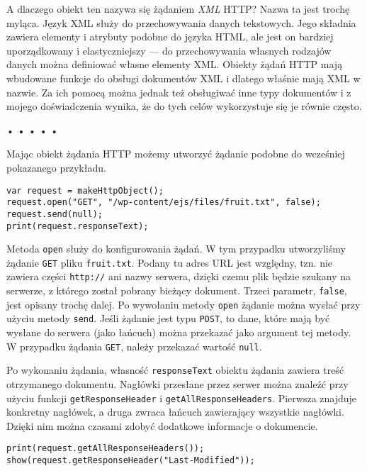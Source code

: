   
A dlaczego obiekt ten nazywa się żądaniem \emph{XML} HTTP? Nazwa ta jest trochę myląca. Język XML służy do przechowywania danych tekstowych. Jego składnia zawiera elementy i atrybuty podobne do języka HTML, ale jest on bardziej uporządkowany i elastyczniejszy — do przechowywania własnych rodzajów danych można definiować własne elementy XML. Obiekty żądań HTTP mają wbudowane funkcje do obsługi dokumentów XML i dlatego właśnie mają XML w nazwie. Za ich pomocą można jednak też obsługiwać inne typy dokumentów i z mojego doświadczenia wynika, że do tych celów wykorzystuje się je równie często.


\begin{center}
• • • • •
\end{center}

  
Mając obiekt żądania HTTP możemy utworzyć żądanie podobne do wcześniej pokazanego przykładu.

  
\begin{verbatim} 
var request = makeHttpObject();
request.open("GET", "/wp-content/ejs/files/fruit.txt", false);
request.send(null);
print(request.responseText);
 \end{verbatim}
  
Metoda \texttt{open} służy do konfigurowania żądań. W tym przypadku utworzyliśmy żądanie \texttt{GET} pliku \texttt{fruit.txt}. Podany tu adres URL jest względny, tzn. nie zawiera części \texttt{http://} ani nazwy serwera, dzięki czemu plik będzie szukany na serwerze, z którego został pobrany bieżący dokument. Trzeci parametr, \texttt{false}, jest opisany trochę dalej. Po wywołaniu metody \texttt{open} żądanie można wysłać przy użyciu metody \texttt{send}. Jeśli żądanie jest typu \texttt{POST}, to dane, które mają być wysłane do serwera (jako łańcuch) można przekazać jako argument tej metody. W przypadku żądania \texttt{GET}, należy przekazać wartość \texttt{null}.

  
Po wykonaniu żądania, własność \texttt{responseText} obiektu żądania zawiera treść otrzymanego dokumentu. Nagłówki przesłane przez serwer można znaleźć przy użyciu funkcji \texttt{getResponseHeader} i \texttt{getAllResponseHeaders}. Pierwsza znajduje konkretny nagłówek, a druga zwraca łańcuch zawierający wszystkie nagłówki. Dzięki nim można czasami zdobyć dodatkowe informacje o dokumencie.

  
\begin{verbatim} 
print(request.getAllResponseHeaders());
show(request.getResponseHeader("Last-Modified"));
 \end{verbatim}
  
